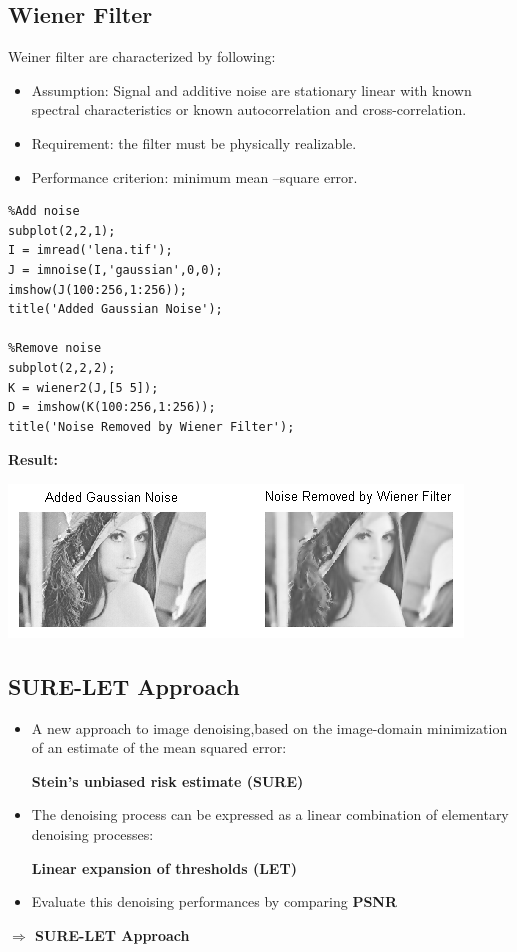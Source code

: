 \documentclass[10pt]{article}
\begin{document}
\subsection{Wiener Filter}

Weiner filter are characterized by following:
\begin{itemize}
	\item Assumption: Signal and additive noise are stationary linear with known spectral characteristics or known autocorrelation and cross-correlation.
	\item Requirement: the filter must be physically realizable.
	\item Performance criterion: minimum mean –square error. 
\end{itemize} 

\begin{lstlisting}
%Add noise
subplot(2,2,1);
I = imread('lena.tif');
J = imnoise(I,'gaussian',0,0);
imshow(J(100:256,1:256));
title('Added Gaussian Noise');

%Remove noise
subplot(2,2,2);
K = wiener2(J,[5 5]);
D = imshow(K(100:256,1:256));
title('Noise Removed by Wiener Filter');
\end{lstlisting} 

\textbf{Result:}

\includegraphics{Wiener.png}

\subsection{SURE-LET Approach}
	\begin{itemize}
	\item A new approach to image denoising,based on the image-domain minimization of an estimate of the
	mean squared error:
	
	\textbf{Stein's unbiased risk estimate (SURE)}
	\item The denoising process can
	be expressed as a linear combination of elementary denoising
	processes: 
	
	\textbf{Linear expansion of thresholds (LET)}
		\item  Evaluate this denoising performances by comparing \textbf{PSNR}
\end{itemize}
\textbf{$\Rightarrow$ SURE-LET Approach}
\end{document}
